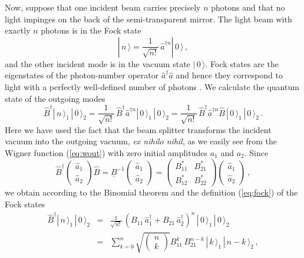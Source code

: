 \documentclass[12pt,amsmath,amssymb]{article}
\numberwithin{equation}{section}
\begin{document}
Now, suppose that one incident beam carries precisely $n$ photons
and that no light impinges on the back of the semi-transparent
mirror. The light beam with exactly $n$ photons is in the Fock
state \cite{Leonhardt}
\begin{equation}
\label{eq:fock} |\,n\,\rangle =
\frac{1}{\sqrt{n!}}\,\hat{a}^{\dagger n} |\,0\,\rangle \,,
\end{equation}
and the other incident mode is in the vacuum state
$|\,0\,\rangle$. Fock states are the eigenstates of the
photon-number operator $\hat{a}^\dagger\hat{a}$ and hence they
correspond to light with a perfectly well-defined number of
photons \cite{Leonhardt}. We calculate the quantum state of the
outgoing modes
\begin{equation}
\hat{B}^\dagger |\,n\,\rangle_1\, |\,0\,\rangle_2 =
\frac{1}{\sqrt{n!}}\,\hat{B}^\dagger\hat{a}^{\dagger n}
|\,0\,\rangle_1\, |\,0\,\rangle_2 =
\frac{1}{\sqrt{n!}}\,\hat{B}^\dagger\hat{a}^{\dagger n}\hat{B}\,
|\,0\,\rangle_1\, |\,0\,\rangle_2 \,.
\end{equation}
Here we have used the fact that the beam splitter transforms the
incident vacuum into the outgoing vacuum, {\it ex nihilo nihil},
as we easily see from the Wigner function (\ref{eq:wout}) with
zero initial amplitudes $a_1$ and $a_2$. Since
\begin{equation}
\hat{B}^\dagger \left(
    \begin{array}{c}
     \hat{a}_1  \\
     \hat{a}_2
    \end{array}
\right) \hat{B} = \underline{B}^{-1} \left(
    \begin{array}{c}
     \hat{a}_1  \\
     \hat{a}_2
    \end{array}
\right) = \left(
    \begin{array}{cc}
      B_{11}^* & B_{21}^* \\
      B_{12}^* & B_{22}^*
    \end{array}
\right)\left(
    \begin{array}{c}
     \hat{a}_1  \\
     \hat{a}_2
    \end{array}
\right)\,,
\end{equation}
we obtain according to the Binomial theorem and the definition
(\ref{eq:fock}) of the Fock states
\begin{eqnarray}
\hat{B}^\dagger |\,n\,\rangle_1\, |\,0\,\rangle_2 &=&
\frac{1}{\sqrt{n!}}\,\left(B_{11}\,\hat{a}_1^\dagger +
B_{21}\,\hat{a}_2^\dagger\right)^n
\,|\,0\,\rangle_1\,|\,0\,\rangle_2 \nonumber\\
&=& \sum_{k=0}^n
\sqrt{
\left(\begin{array}{c}n\\k\end{array}\right)
}
B_{11}^k\,B_{21}^{n-k} \,|\,k\,\rangle_1\,|\,n-k\,\rangle_2 \,,
\label{eq:focksplit}
\end{eqnarray}
\end{document}
